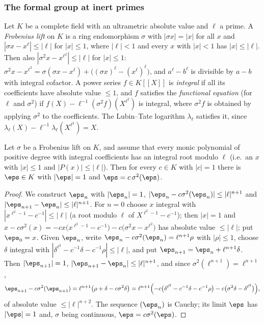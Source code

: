 \subsubsection{The formal group at inert primes}

Let $K$ be a complete field with an ultrametric absolute value and $\ell$ a prime. A \emph{Frobenius lift} on $K$ is a
ring endomorphism $\sigma$ with $|\sigma x|=|x|$ for all $x$ and $|\sigma x-x^\ell|\le|\ell|$ for $|x|\le1$, where
$|\ell|<1$ and every $x$ with $|x|<1$ has $|x|\le|\ell|$. Then also $|\sigma^2x-x^{\ell^2}|\le|\ell|$ for $|x|\le1$:
$\sigma^2x-x^{\ell^2}=\sigma(\sigma x-x^\ell)+\bigl((\sigma x)^\ell-(x^\ell)^\ell\bigr)$, and
$a^\ell-b^\ell$ is divisible by $a-b$ with integral cofactor. A power series $f\in K[[X]]$ is \emph{integral} if all its
coefficients have absolute value $\le1$, and $f$ satisfies the \emph{functional equation} (for $\ell$ and $\sigma^2$)
if $f(X)-\ell^{-1}(\sigma^2f)(X^{\ell^2})$ is integral, where $\sigma^2f$ is obtained by applying $\sigma^2$ to the
coefficients. The Lubin--Tate logarithm $\lambda_\ell$ satisfies it, since $\lambda_\ell(X)-\ell^{-1}\lambda_\ell(X^{\ell^2})=X$.

\begin{lemma}[Lang]\label{pf:reckernel:lang}
Let $\sigma$ be a Frobenius lift on $K$, and assume that every monic polynomial of positive degree with integral
coefficients has an integral root modulo $\ell$ (i.e.\ an $x$ with $|x|\le1$ and $|P(x)|\le|\ell|$). Then for every
$c\in K$ with $|c|=1$ there is $\eps\in K$ with $|\eps|=1$ and $\eps=c\,\sigma^2(\eps)$.
\end{lemma}

\begin{proof}
We construct $\eps_n$ with $|\eps_n|=1$, $|\eps_n-c\sigma^2(\eps_n)|\le|\ell|^{n+1}$ and
$|\eps_{n+1}-\eps_n|\le|\ell|^{n+1}$. For $n=0$ choose $x$ integral with $|x^{\ell^2-1}-c^{-1}|\le|\ell|$ (a root modulo
$\ell$ of $X^{\ell^2-1}-c^{-1}$); then $|x|=1$ and
$x-c\sigma^2(x)=-cx\bigl(x^{\ell^2-1}-c^{-1}\bigr)-c\bigl(\sigma^2x-x^{\ell^2}\bigr)$ has absolute value $\le|\ell|$; put
$\eps_0=x$. Given $\eps_n$, write $\eps_n-c\sigma^2(\eps_n)=\ell^{n+1}\rho$ with $|\rho|\le1$, choose $\delta$ integral
with $|\delta^{\ell^2}-c^{-1}\delta-c^{-1}\rho|\le|\ell|$, and put $\eps_{n+1}=\eps_n+\ell^{n+1}\delta$. Then
$|\eps_{n+1}|=1$, $|\eps_{n+1}-\eps_n|\le|\ell|^{n+1}$, and since $\sigma^2(\ell^{n+1})=\ell^{n+1}$,
\[
\eps_{n+1}-c\sigma^2(\eps_{n+1})=\ell^{n+1}\bigl(\rho+\delta-c\sigma^2\delta\bigr)
=\ell^{n+1}\Bigl(-c\bigl(\delta^{\ell^2}-c^{-1}\delta-c^{-1}\rho\bigr)-c\bigl(\sigma^2\delta-\delta^{\ell^2}\bigr)\Bigr),
\]
of absolute value $\le|\ell|^{n+2}$. The sequence $(\eps_n)$ is Cauchy; its limit $\eps$ has $|\eps|=1$ and, $\sigma$
being continuous, $\eps=c\sigma^2(\eps)$.
\end{proof}

